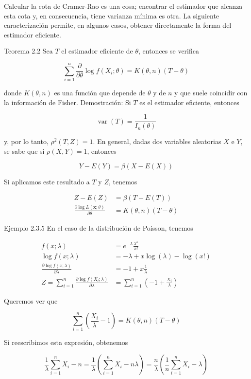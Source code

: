 \documentclass[
]{article}
\begin{document}
Calcular la cota de Cramer-Rao es una cosa; encontrar el estimador que alcanza esta cota y, en consecuencia, tiene varianza mínima es otra. La siguiente caracterización permite, en algunos casos, obtener directamente la forma del estimador eficiente.

Teorema 2.2 Sea \(T\) el estimador eficiente de \(\theta\), entonces se verifica

\[
\sum_{i=1}^{n} \frac{\partial}{\partial \theta} \log f\left(X_{i} ; \theta\right)=K(\theta, n)(T-\theta)
\]

donde \(K(\theta, n)\) es una función que depende de \(\theta\) y de \(n\) y que suele coincidir con la información de Fisher.
Demostración:
Si \(T\) es el estimador eficiente, entonces

\[
\operatorname{var}(T)=\frac{1}{I_{n}(\theta)}
\]

y, por lo tanto, \(\rho^{2}(T, Z)=1\).
En general, dadas dos variables aleatorias \(X\) e \(Y\), se sabe que si \(\rho(X, Y)=1\), entonces

\[
Y-E(Y)=\beta(X-E(X))
\]

Si aplicamos este resultado a \(T\) y \(Z\), tenemos

\[
\begin{aligned}
Z-E(Z) & =\beta(T-E(T)) \\
\frac{\partial \log L(\mathbf{x} ; \theta)}{\partial \theta} & =K(\theta, n)(T-\theta)
\end{aligned}
\]

Ejemplo 2.3.5 En el caso de la distribución de Poisson, tenemos

\[
\begin{aligned}
f(x ; \lambda) & =e^{-\lambda} \frac{\lambda^{x}}{x!} \\
\log f(x ; \lambda) & =-\lambda+x \log (\lambda)-\log (x!) \\
\frac{\partial \log f(x ; \lambda)}{\partial \lambda} & =-1+x \frac{1}{\lambda} \\
Z=\sum_{i=1}^{n} \frac{\partial \log f\left(X_{i} ; \lambda\right)}{\partial \lambda} & =\sum_{i=1}^{n}\left(-1+\frac{X_{i}}{\lambda}\right)
\end{aligned}
\]

Queremos ver que

\[
\sum_{i=1}^{n}\left(\frac{X_{i}}{\lambda}-1\right)=K(\theta, n)(T-\theta)
\]

Si reescribimos esta expresión, obtenemos

\[
\frac{1}{\lambda} \sum_{i=1}^{n} X_{i}-n=\frac{1}{\lambda}\left(\sum_{i=1}^{n} X_{i}-n \lambda\right)=\frac{n}{\lambda}\left(\frac{1}{n} \sum_{i=1}^{n} X_{i}-\lambda\right)
\]
\end{document}
